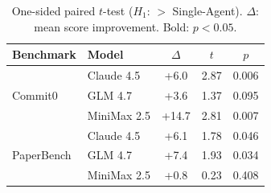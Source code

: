 \begin{table}
\vspace{-12pt}
\centering
\small
\begin{tabular}{llccc}
\toprule
Benchmark & Model & $\Delta$ & $t$ & $p$ \\
\midrule
\multirow{3}{*}{Commit0}
 & Claude 4.5  & +6.0 & 2.87 & 0.006 \\
 & GLM 4.7     & +3.6 & 1.37 & 0.095 \\
 & MiniMax 2.5 & +14.7 & 2.81 & 0.007 \\
\midrule
\multirow{3}{*}{PaperBench}
 & Claude 4.5  & +6.1 & 1.78 & 0.046 \\
 & GLM 4.7     & +7.4 & 1.93 & 0.034 \\
 & MiniMax 2.5 & +0.8 & 0.23 & 0.408 \\
\bottomrule
\end{tabular}
\caption{One-sided paired $t$-test ($H_1$: \ourmethod $>$ Single-Agent). $\Delta$: mean score improvement. Bold: $p < 0.05$.}
\label{tab:significance}
\vspace{-10pt}
\end{table}
 